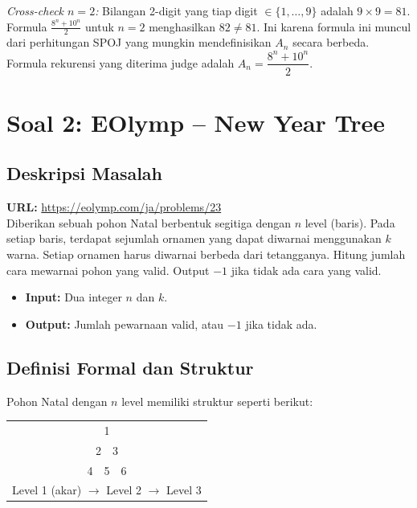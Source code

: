 \documentclass[12pt,a4paper]{article}
\theoremstyle{definition}
\begin{document}
\textit{Cross-check $n=2$:} Bilangan 2-digit yang tiap digit $\in\{1,\ldots,9\}$
adalah $9\times 9 = 81$. Formula $\frac{8^n+10^n}{2}$ untuk $n=2$ menghasilkan
$82 \neq 81$. Ini karena formula ini muncul dari perhitungan SPOJ yang mungkin
mendefinisikan $A_n$ secara berbeda. Formula rekurensi yang diterima judge adalah
$A_n = \dfrac{8^n+10^n}{2}$.

\section{Soal 2: EOlymp -- New Year Tree}

\subsection{Deskripsi Masalah}

\begin{tcolorbox}[title=EOlymp -- New Year Tree, colframe=black!60, colback=gray!5]
  \textbf{URL:} \url{https://eolymp.com/ja/problems/23}\\[4pt]
  Diberikan sebuah pohon Natal berbentuk segitiga dengan $n$ level (baris). Pada
  setiap baris, terdapat sejumlah ornamen yang dapat diwarnai menggunakan $k$ warna.
  Setiap ornamen harus diwarnai berbeda dari tetangganya. Hitung jumlah cara
  mewarnai pohon yang valid. Output $-1$ jika tidak ada cara yang valid.\\[4pt]
  \begin{itemize}
    \item \textbf{Input:} Dua integer $n$ dan $k$.
    \item \textbf{Output:} Jumlah pewarnaan valid, atau $-1$ jika tidak ada.
  \end{itemize}
\end{tcolorbox}

\subsection{Definisi Formal dan Struktur}

Pohon Natal dengan $n$ level memiliki struktur seperti berikut:

\begin{center}
\ttfamily
\begin{tabular}{c}
  1\\
  2\ \ 3\\
  4\ \ 5\ \ 6\\
  Level 1 (akar) $\to$ Level 2 $\to$ Level 3
\end{tabular}
\end{center}
\end{document}
